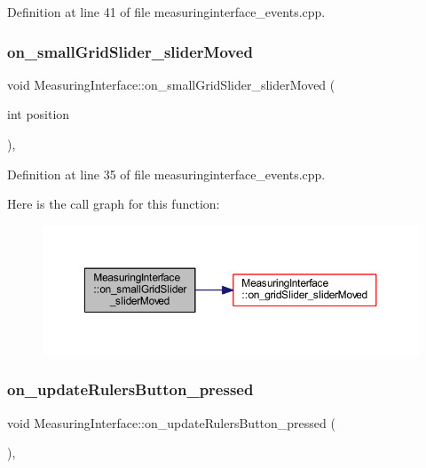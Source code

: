 Definition at line 41 of file measuringinterface\+\_\+events.\+cpp.

\mbox{\label{class_measuring_interface_af76bfc58f5f4a96c860d64dd0b650e5e}} 
\subsubsection{\texorpdfstring{on\_smallGridSlider\_sliderMoved}{on\_smallGridSlider\_sliderMoved}}
{\footnotesize\ttfamily void Measuring\+Interface\+::on\+\_\+small\+Grid\+Slider\+\_\+slider\+Moved (\begin{DoxyParamCaption}\item[{int}]{position }\end{DoxyParamCaption})\hspace{0.3cm}{\ttfamily [private]}, {\ttfamily [slot]}}



Definition at line 35 of file measuringinterface\+\_\+events.\+cpp.

Here is the call graph for this function\+:
\nopagebreak
\begin{figure}[H]
\begin{center}
\leavevmode
\includegraphics[width=350pt]{class_measuring_interface_af76bfc58f5f4a96c860d64dd0b650e5e_cgraph}
\end{center}
\end{figure}
\mbox{\label{class_measuring_interface_a18a63bf732f8df1ed9b94450b19ef455}} 
\subsubsection{\texorpdfstring{on\_updateRulersButton\_pressed}{on\_updateRulersButton\_pressed}}
{\footnotesize\ttfamily void Measuring\+Interface\+::on\+\_\+update\+Rulers\+Button\+\_\+pressed (\begin{DoxyParamCaption}{ }\end{DoxyParamCaption})\hspace{0.3cm}{\ttfamily [private]}, {\ttfamily [slot]}}



